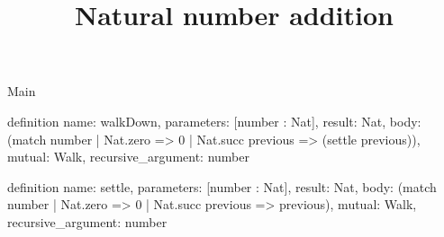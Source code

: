 \begin{lexlean}{Main}
\title{Natural number addition}
\begin{semanticmodule}
definition{
  name: walkDown,
  parameters: [number : Nat],
  result: Nat,
  body: (match number | Nat.zero => 0 | Nat.succ previous => (settle previous)),
  mutual: Walk,
  recursive_argument: number
}

definition{
  name: settle,
  parameters: [number : Nat],
  result: Nat,
  body: (match number | Nat.zero => 0 | Nat.succ previous => previous),
  mutual: Walk,
  recursive_argument: number
}
\end{semanticmodule}
\end{lexlean}

